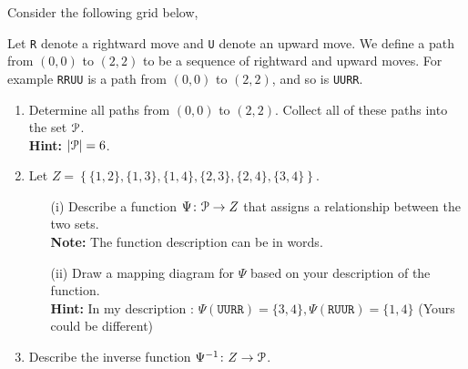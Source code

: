 \documentclass[12pt]{article} %
\begin{document}
\newpage

\begin{qstn}
  Consider the following grid below,
  \begin{center}
  \end{center}

  Let \texttt{R} denote a rightward move and \texttt{U} denote an upward move. We define a path from $(0,0)$ to  $(2,2)$ to be a 
  sequence of rightward and upward moves. For example \texttt{RRUU} is a path from $(0,0)$ to  $(2,2)$, and so is
  \texttt{UURR}.

  \begin{enumerate}[label=(\alph*)]
    \item Determine all paths from $(0,0)$ to  $(2,2)$. Collect all of these paths into the set $\EuScript{P}$.\\
      \textbf{Hint:} $\left|\EuScript{P}\right| = 6$.
    \item Let $Z = \left\{ \{1,2\}, \{1,3\}, \{1,4\}, \{2,3\}, \{2,4\} , \{3,4\}\right\} $.
      \begin{enumerate}[label=(\alph*)]
        \item [(i)]Describe a function $\Psi \colon \EuScript{P} \to Z$ that assigns a 
          relationship between the two sets.\\
          \textbf{Note:} The function description can be in words.
        \item [(ii)] Draw a mapping diagram for $\Psi$ based on your description of the function.\\
          \textbf{Hint:} In my description : $\Psi(\texttt{UURR}) = \{3,4\}, \Psi(\texttt{RUUR}) = \{1,4\} $
          (Yours could be different)\\

      \end{enumerate}
  \item Describe the inverse function $\Psi^{-1} \colon Z \to \EuScript{P}$.\\

  \end{enumerate}

  
\end{qstn}
\end{document}
